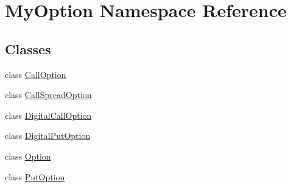 \hypertarget{namespaceMyOption}{}\section{My\+Option Namespace Reference}
\label{namespaceMyOption}
\subsection*{Classes}
\begin{DoxyCompactItemize}
\item 
class \hyperlink{classMyOption_1_1CallOption}{Call\+Option}
\item 
class \hyperlink{classMyOption_1_1CallSpreadOption}{Call\+Spread\+Option}
\item 
class \hyperlink{classMyOption_1_1DigitalCallOption}{Digital\+Call\+Option}
\item 
class \hyperlink{classMyOption_1_1DigitalPutOption}{Digital\+Put\+Option}
\item 
class \hyperlink{classMyOption_1_1Option}{Option}
\item 
class \hyperlink{classMyOption_1_1PutOption}{Put\+Option}
\end{DoxyCompactItemize}
